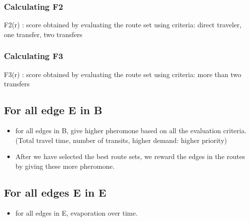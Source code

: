 \subsubsection{Calculating F2}
F2(r) : score obtained by evaluating the route set using criteria: direct traveler, one transfer, two transfers
\subsubsection{Calculating F3}
F3(r) : score obtained by evaluating the route set using criteria: more than two transfers


\subsection{For all edge E in B}
\begin{itemize}
\item for all edges in B, give higher pheromone based on all the evaluation criteria. (Total travel time, number of transits, higher demand: higher priority)
\item After we have selected the best route sets, we reward the edges in the routes by giving these more pheromone.
\end{itemize}

\subsection{For all edges E in E}
\begin{itemize}
\item for all edges in E, evaporation over time. 
\end{itemize}

